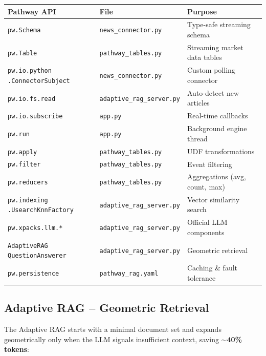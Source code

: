 \documentclass[11pt, a4paper]{article}
\begin{document}
\begin{center}
\small
\begin{tabular}{L{4.2cm} L{3.8cm} L{5.2cm}}
  \toprule
  \textbf{Pathway API} & \textbf{File} & \textbf{Purpose} \\
  \midrule
  \texttt{pw.Schema} & \texttt{news\_connector.py} & Type-safe streaming schema \\
  \texttt{pw.Table} & \texttt{pathway\_tables.py} & Streaming market data tables \\
  \texttt{pw.io.python} \newline\texttt{.ConnectorSubject} & \texttt{news\_connector.py} & Custom polling connector \\
  \texttt{pw.io.fs.read} & \texttt{adaptive\_rag\_server.py} & Auto-detect new articles \\
  \texttt{pw.io.subscribe} & \texttt{app.py} & Real-time callbacks \\
  \texttt{pw.run} & \texttt{app.py} & Background engine thread \\
  \texttt{pw.apply} & \texttt{pathway\_tables.py} & UDF transformations \\
  \texttt{pw.filter} & \texttt{pathway\_tables.py} & Event filtering \\
  \texttt{pw.reducers} & \texttt{pathway\_tables.py} & Aggregations (avg, count, max) \\
  \texttt{pw.indexing} \newline\texttt{.UsearchKnnFactory} & \texttt{adaptive\_rag\_server.py} & Vector similarity search \\
  \texttt{pw.xpacks.llm.*} & \texttt{adaptive\_rag\_server.py} & Official LLM components \\
  \texttt{AdaptiveRAG} \newline\texttt{QuestionAnswerer} & \texttt{adaptive\_rag\_server.py} & Geometric retrieval \\
  \texttt{pw.persistence} & \texttt{pathway\_rag.yaml} & Caching \& fault tolerance \\
  \bottomrule
\end{tabular}
\end{center}

\subsection{Adaptive RAG -- Geometric Retrieval}

The Adaptive RAG starts with a minimal document set and expands geometrically
only when the LLM signals insufficient context, saving \textbf{$\sim$40\% tokens}:
\end{document}
